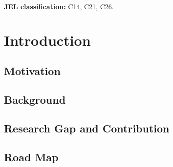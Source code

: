 \documentclass[12pt, a4paper, oneside]{article}
\theoremstyle{plain}
\theoremstyle{definition}
\begin{document}
\bigskip
\noindent\textbf{JEL classification:} C14, C21, C26.

\newpage
\tableofcontents

\newpage
\listoffigures
{}

\newpage
\listoftables
{}

\newpage
{}
\setcounter{page}{1}

\section{Introduction}
\label{sec:intro}

\subsection{Motivation}
\label{subsec:motivation}


\subsection{Background}
\label{subsec:background}


\subsection{Research Gap and Contribution}
\label{subsec:contribution}


\subsection{Road Map}
\label{subsec:roadmap}



\end{document}
